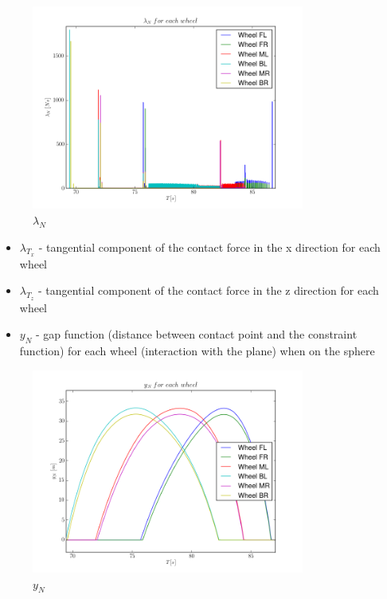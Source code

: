 \begin{figure}[H]
  \centering
    \includegraphics[width=0.8\textwidth]{lambdaN6sphere}
  \caption{$\lambda_{N}$}
\end{figure}

\begin{itemize}
  \item $\lambda_{T_x}$ - tangential component of the contact force in the x direction for each wheel
\end{itemize}

\begin{itemize}
  \item $\lambda_{T_z}$ - tangential component of the contact force in the z direction for each wheel
\end{itemize}

\begin{itemize}
  \item $y_{N}$ - gap function (distance between contact point and the constraint function) for each wheel (interaction with the plane) when on the sphere
\end{itemize}

\begin{figure}[H]
  \centering
    \includegraphics[width=0.8\textwidth]{yN6plane}
  \caption{$y_{N}$}
\end{figure}

